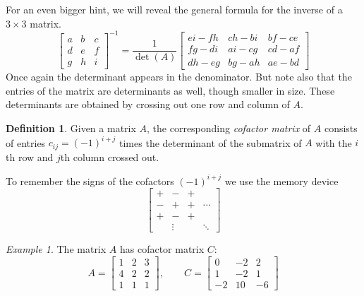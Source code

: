\documentclass[11pt,oneside]{amsbook}
\theoremstyle{definition}
\theoremstyle{plain}
\theoremstyle{definition}
\newtheorem{definition}[theorem]{Definition}
\theoremstyle{remark}
\newtheorem{example}[theorem]{Example}
\numberwithin{equation}{section}
\numberwithin{figure}{section}
\begin{document}
For an even bigger hint, we will reveal the general formula for the inverse of a $3\times 3$ matrix.
\[\begin{bmatrix}a&b&c\\d&e&f\\g&h&i\end{bmatrix}^{-1}
  =\frac{1}{\det(A)}\begin{bmatrix}ei-fh&ch-bi&bf-ce\\fg-di&ai-cg&cd-af\\
  dh-eg&bg-ah&ae-bd\end{bmatrix}
\]
Once again the determinant appears in the denominator. But note also that the entries of the matrix are determinants as well, though smaller in size. These determinants are obtained by crossing out one row and column of $A$.

\begin{definition}
  Given a matrix $A$, the corresponding \emph{cofactor matrix} of $A$ consists of entries $c_{ij}=(-1)^{i+j}$ times the determinant of the submatrix of $A$ with the $i$th row and $j$th column crossed out.
\end{definition}

To remember the signs of the cofactors $(-1)^{i+j}$ we use the memory device
\[\begin{bmatrix}
    +&-&+\\-&+&+&\cdots\\+&-&+\\&\vdots&&\ddots
  \end{bmatrix}
\]

\begin{example}
  The matrix $A$ has cofactor matrix $C$:
  \[A=\begin{bmatrix}1&2&3\\4&2&2\\1&1&1\end{bmatrix},\qquad
    C=\begin{bmatrix}0&-2&2\\1&-2&1\\-2&10&-6\end{bmatrix}
  \]
\end{example}  
\end{document}
